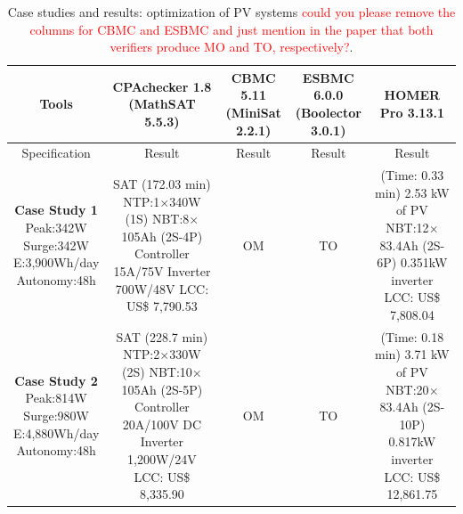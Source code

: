 \documentclass[runningheads]{llncs}
\begin{document}
\begin{table}[!t]
\caption{Case studies and results: optimization of PV systems \textcolor{red}{could you please remove the columns for CBMC and ESBMC and just mention in the paper that both verifiers produce MO and TO, respectively?}.}\label{tab1}
\begin{tabular}{|c|c|c|c|c|}
\hline
\hline
Tools & \makecell{CPAchecker 1.8\\(MathSAT 5.5.3)}& \makecell{CBMC 5.11\\(MiniSat 2.2.1)} & \makecell {ESBMC 6.0.0\\(Boolector 3.0.1)} & HOMER Pro 3.13.1\\
\hline
\hline
Specification & Result & Result & Result & Result \\
\hline
\makecell{\textbf{Case Study 1}\\Peak:342W\\Surge:342W \\E:3,900Wh/day\\Autonomy:48h} & \makecell{SAT (172.03 min) \\NTP:1$\times$340W (1S)\\NBT:8$\times$105Ah (2S-4P)\\Controller 15A/75V\\Inverter 700W/48V\\LCC: US\$ 7,790.53} & OM & TO & \makecell{(Time: 0.33 min)\\2.53 kW of PV\\NBT:12$\times$83.4Ah (2S-6P)\\0.351kW inverter\\LCC: US\$ 7,808.04}\\
\hline
\makecell{\textbf{Case Study 2}\\Peak:814W\\Surge:980W\\E:4,880Wh/day\\Autonomy:48h} & \makecell {SAT (228.7 min) \\NTP:2$\times$330W (2S)\\NBT:10$\times$105Ah (2S-5P)\\Controller 20A/100V DC\\Inverter 1,200W/24V \\LCC: US\$ 8,335.90} & OM & TO & \makecell{(Time: 0.18 min)\\3.71 kW of PV\\NBT:20$\times$83.4Ah (2S-10P)\\0.817kW inverter\\LCC: US\$ 12,861.75} \\

\end{tabular}
\end{table}
\end{document}

